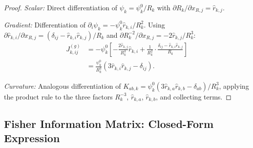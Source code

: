 \documentclass[twocolumn,superscriptaddress,prd,nofootinbib]{revtex4-2}
\begin{document}
\begin{proof}
\emph{Scalar:} Direct differentiation of $\psi_k = \psi_k^0/R_k$ with
$\partial R_k/\partial x_{R,j} = \hat{r}_{k,j}$.

\emph{Gradient:} Differentiation of
$\partial_i\psi_k = -\psi_k^0 \hat{r}_{k,i}/R_k^2$. Using
$\partial\hat{r}_{k,i}/\partial x_{R,j} = (\delta_{ij} - \hat{r}_{k,i}\hat{r}_{k,j})/R_k$
and $\partial R_k^{-2}/\partial x_{R,j} = -2\hat{r}_{k,j}/R_k^3$:
\begin{align}
J_{k,ij}^{(g)} &= -\psi_k^0\left[-\frac{2\hat{r}_{k,j}}{R_k^3}\hat{r}_{k,i}
+ \frac{1}{R_k^2}\cdot\frac{\delta_{ij}-\hat{r}_{k,i}\hat{r}_{k,j}}{R_k}\right] \nonumber\\
&= \frac{\psi_k^0}{R_k^3}(3\hat{r}_{k,i}\hat{r}_{k,j} - \delta_{ij}).
\end{align}

\emph{Curvature:} Analogous differentiation of
$K_{ab,k} = \psi_k^0(3\hat{r}_{k,a}\hat{r}_{k,b} - \delta_{ab})/R_k^3$,
applying the product rule to the three factors $R_k^{-3}$,
$\hat{r}_{k,a}$, $\hat{r}_{k,b}$, and collecting terms.
\end{proof}

\subsection{Fisher Information Matrix: Closed-Form Expression}
\end{document}
